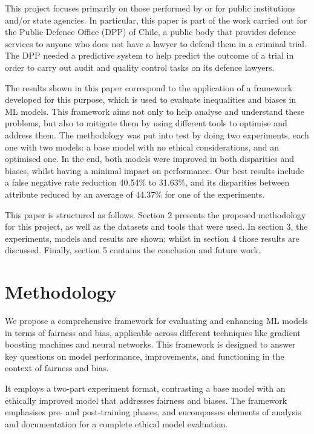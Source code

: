 \documentclass[twoside,11pt]{article}
\begin{document}
This project focuses primarily on those performed by or for public institutions and/or state agencies. In particular, this paper is part of the work carried out for the Public Defence Office (DPP) of Chile, a public body that provides defence services to anyone who does not have a lawyer to defend them in a criminal trial. The DPP needed a predictive system to help predict the outcome of a trial in order to carry out audit and quality control tasks on its defence lawyers.

The results shown in this paper correspond to the application of a framework developed for this purpose, which is used to evaluate inequalities and biases in ML models. This framework aims not only to help analyse and understand these problems, but also to mitigate them by using different tools to optimise and address them. The methodology was put into test by doing two experiments, each one with two models: a base model with no ethical considerations, and an optimised one. In the end, both models were improved in both disparities and biases, whilst having a minimal impact on performance. Our best results include a false negative rate reduction 40.54\% to 31.63\%, and its disparities between attribute reduced by an average of 44.37\% for one of the experiments.

This paper is structured as follows. Section 2 presents the proposed methodology for this project, as well as the datasets and tools that were used. In section 3, the experiments, models and results are shown; whilst in section 4 those results are discussed. Finally, section 5 contains the conclusion and future work.


\section{Methodology}
\label{methods}

We propose a comprehensive framework for evaluating and enhancing ML models in terms of fairness and bias, applicable across different techniques like gradient boosting machines and neural networks. This framework is designed to answer key questions on model performance, improvements, and functioning in the context of fairness and bias.

It employs a two-part experiment format, contrasting a base model with an ethically improved model that addresses fairness and biases. The framework emphasises pre- and post-training phases, and encompasses elements of analysis and documentation for a complete ethical model evaluation.
\end{document}
